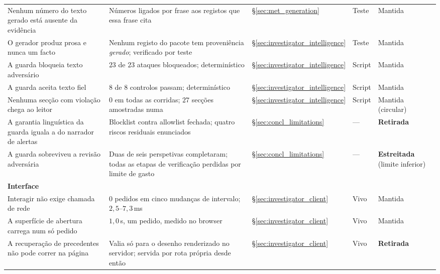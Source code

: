 \begin{table}[ht]
\begin{tabular}{p{4.6cm} p{3.5cm} p{1.6cm} p{1.2cm} p{1.7cm}}
Nenhum número do texto gerado está ausente da evidência & Números ligados por frase aos registos que essa frase cita & §\ref{sec:met_generation} & Teste & Mantida \\
O gerador produz prosa e nunca um facto & Nenhum registo do pacote tem proveniência \emph{gerado}; verificado por teste & §\ref{sec:investigator_intelligence} & Teste & Mantida \\
A guarda bloqueia texto adversário & $23$ de $23$ ataques bloqueados; determinístico & §\ref{sec:investigator_intelligence} & Script & Mantida \\
A guarda aceita texto fiel & $8$ de $8$ controlos passam; determinístico & §\ref{sec:investigator_intelligence} & Script & Mantida \\
Nenhuma secção com violação chega ao leitor & $0$ em todas as corridas; $27$ secções amostradas numa & §\ref{sec:investigator_intelligence} & Script & Mantida (circular) \\
A garantia linguística da guarda iguala a do narrador de alertas & Blocklist contra allowlist fechada; quatro riscos residuais enunciados & §\ref{sec:concl_limitations} & --- & \textbf{Retirada} \\
A guarda sobreviveu a revisão adversária & Duas de seis perspetivas completaram; todas as etapas de verificação perdidas por limite de gasto & §\ref{sec:concl_limitations} & --- & \textbf{Estreitada} (limite inferior) \\
\midrule
\multicolumn{5}{l}{\textbf{Interface}} \\
Interagir não exige chamada de rede & $0$ pedidos em cinco mudanças de intervalo; $2,5$--$7,3$\,ms & §\ref{sec:investigator_client} & Vivo & Mantida \\
A superfície de abertura carrega num só pedido & $1,0$\,s, um pedido, medido no browser & §\ref{sec:investigator_client} & Vivo & Mantida \\
A recuperação de precedentes não pode correr na página & Valia só para o desenho renderizado no servidor; servida por rota própria desde então & §\ref{sec:investigator_client} & Vivo & \textbf{Retirada} \\
\bottomrule
\end{tabular}
\end{table}

